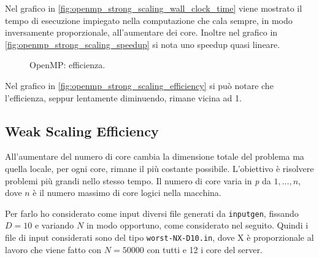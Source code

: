 \documentclass[11pt, a4paper]{article}
\begin{document}
Nel grafico in \autoref{fig:openmp_strong_scaling_wall_clock_time} viene mostrato il tempo di esecuzione impiegato nella
computazione che cala sempre, in modo inversamente proporzionale, all'aumentare dei core.
Inoltre nel grafico in \autoref{fig:openmp_strong_scaling_speedup} si nota uno speedup quasi lineare.

\begin{figure}[H]
  \centering
    \caption{\label{fig:openmp_strong_scaling_efficiency} OpenMP: efficienza.}
\end{figure}

Nel grafico in \autoref{fig:openmp_strong_scaling_efficiency} si può notare che l'efficienza, seppur lentamente diminuendo, rimane
vicina ad 1.

\subsection{Weak Scaling Efficiency}

All'aumentare del numero di core cambia la dimensione totale del problema ma quella locale, per ogni core, rimane il più costante
possibile.
L'obiettivo è risolvere problemi più grandi nello stesso tempo.
Il numero di core varia in \textit{p} da \({1, \dots, n}\), dove \(n\) è il numero massimo di core logici nella macchina.

Per farlo ho considerato come input diversi file generati da \texttt{inputgen}, fissando \(D = 10\) e variando \(N\) in modo
opportuno, come considerato nel seguito.
Quindi i file di input considerati sono del tipo \texttt{worst-NX-D10.in}, dove X è proporzionale al lavoro che viene fatto con
\(N = 50000\) con tutti e 12 i core del server.
\end{document}
